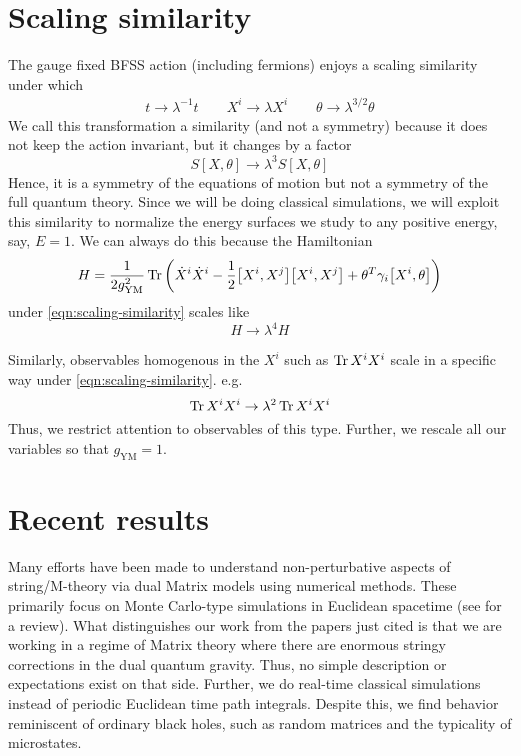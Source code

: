 \section{Scaling similarity}
The gauge fixed BFSS action (including fermions) enjoys a scaling similarity under which
\begin{align}\label{eqn:scaling-similarity}
    t \to \lambda^{-1} t \qquad X^i \to \lambda X^i \qquad \theta \to \lambda^{3/2} \theta
\end{align}
We call this transformation a similarity (and not a symmetry) because it does not keep the action invariant, but it changes by a factor
\begin{equation}
    S[X, \theta] \to \lambda^3 S[X, \theta]
\end{equation}
Hence, it is a symmetry of the equations of motion but not a symmetry of the full quantum theory. Since we will be doing classical simulations, we will exploit this similarity to normalize the energy surfaces we study to any positive energy, say, $E = 1$. We can always do this because the Hamiltonian
\begin{equation}
    H = \frac{1}{2 g_\mathrm{YM}^2} \Tr \left( \dot{X}^i \dot{X}^i - \frac{1}{2} \comm{X^i}{X^j}\comm{X^i}{X^j} + \theta^{T}\gamma_i \comm{X^i}{\theta} \right)
\end{equation}
under \cref{eqn:scaling-similarity} scales like
\begin{equation}
    H \to \lambda^4 H
\end{equation}

Similarly, observables homogenous in the $X^i$ such as $\Tr X^i X^i$ scale in a specific way under \cref{eqn:scaling-similarity}. e.g.
\begin{equation}
    \Tr X^i X^i \to \lambda^2 \Tr X^i X^i
\end{equation}
Thus, we restrict attention to observables of this type. Further, we rescale all our variables so that $g_\mathrm{YM} = 1$.

\section{Recent results}
Many efforts have been made to understand non-perturbative aspects of string/M-theory via dual Matrix models using numerical methods. These primarily focus on Monte Carlo-type simulations in Euclidean spacetime (see \cite{Hanada:2012eg,Anagnostopoulos:2007fw} for a review). What distinguishes our work from the papers just cited is that we are working in a regime of Matrix theory where there are enormous stringy corrections in the dual quantum gravity. Thus, no simple description or expectations exist on that side. Further, we do real-time classical simulations instead of periodic Euclidean time path integrals. Despite this, we find behavior reminiscent of ordinary black holes, such as random matrices and the typicality of microstates.

